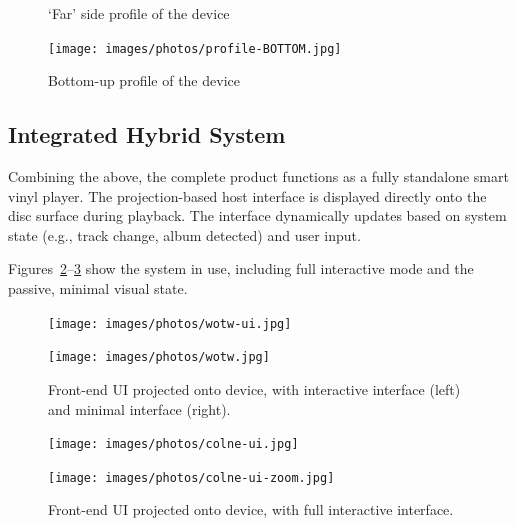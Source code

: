\begin{figure}[H]
\begin{minipage}[b]{0.225\textwidth}
                    \caption{`Far' side profile of the device}
                    \label{fig:side2}
                \end{minipage}
                \hfill
                \begin{minipage}[b]{0.45\textwidth}
                    \centering
                    \texttt{[image: images/photos/profile-BOTTOM.jpg]}
                    \caption{Bottom-up profile of the device}
                    \label{fig:bottom}
                \end{minipage}
            \end{figure}
    
        \subsection{Integrated Hybrid System}
    
            Combining the above, the complete product functions as a fully standalone smart vinyl player. The projection-based host interface is displayed directly onto the disc surface during playback. The interface dynamically updates based on system state (e.g., track change, album detected) and user input.
    
            Figures~\ref{fig:wotw}–\ref{fig:colne} show the system in use, including full interactive mode and the passive, minimal visual state.
    
            \begin{figure}[h]
                \centering
                \begin{minipage}[b]{0.45\textwidth}
                    \centering
                    \texttt{[image: images/photos/wotw-ui.jpg]}
                \end{minipage}
                \hfill
                \begin{minipage}[b]{0.45\textwidth}
                    \centering
                    \texttt{[image: images/photos/wotw.jpg]}
                \end{minipage}
                \caption{Front-end UI projected onto device, with interactive interface (left) and minimal interface (right).}
                \label{fig:wotw}
            \end{figure}
            
            \begin{figure}[h]
                \centering
                \begin{minipage}[b]{0.45\textwidth}
                    \centering
                    \texttt{[image: images/photos/colne-ui.jpg]}
                \end{minipage}
                \hfill
                \begin{minipage}[b]{0.45\textwidth}
                    \centering
                    \texttt{[image: images/photos/colne-ui-zoom.jpg]}
                \end{minipage}
                \caption{Front-end UI projected onto device, with full interactive interface.}
                \label{fig:colne}
            \end{figure}
    
